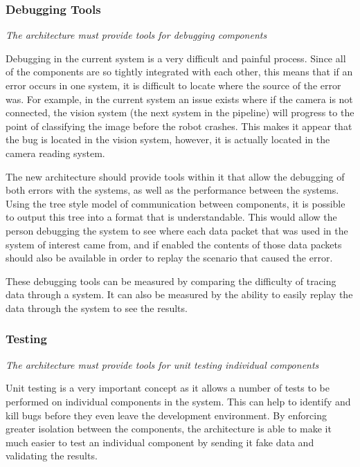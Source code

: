 \documentclass[english,12pt]{scrartcl}
\newcommand{\requirement}[1]{\textit{#1}}
\begin{document}
			\subsubsection{Debugging Tools}
				\requirement{The architecture must provide tools for debugging components}

				Debugging in the current system is a very difficult and painful process. Since all of
				the components are so tightly integrated with each other, this means that if an error
				occurs in one system, it is difficult to locate where the source of the error was. For
				example, in the current system an issue exists where if the camera is not connected, the
				vision system (the next system in the pipeline) will progress to the point of
				classifying the image before the robot crashes. This makes it appear that the bug is
				located in the vision system, however, it is actually located in the camera reading
				system.

				The new architecture should provide tools within it that allow the debugging of both
				errors with the systems, as well as the performance between the systems. Using the tree
				style model of communication between components, it is possible to output this tree into
				a format that is understandable. This would allow the person debugging the system to see
				where each data packet that was used in the system of interest came from, and if enabled
				the contents of those data packets should also be available in order to replay the
				scenario that caused the error.

				These debugging tools can be measured by comparing the difficulty of tracing data through a system. It can also be measured by the ability to easily replay the data through the system to see the results.

			\subsubsection{Testing}
				\requirement{The architecture must provide tools for unit testing individual components}

				Unit testing is a very important concept as it allows a number of tests to be performed
				on individual components in the system. This can help to identify and kill bugs before
				they even leave the development environment. By enforcing greater isolation between the
				components, the architecture is able to make it much easier to test an individual
				component by sending it fake data and validating the results.
\end{document}
